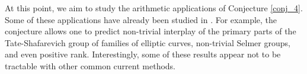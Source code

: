 At this point, we aim to study the arithmetic applications of Conjecture \ref{conj_4}. Some of these applications have already been studied in \cite[\S 3]{DEW1}. For example, the conjecture allows one to predict non-trivial interplay of the primary parts of the Tate-Shafarevich group of families of elliptic curves, non-trivial Selmer groups, and even positive rank. Interestingly, some of these results appear not to be tractable with other common current methods.





